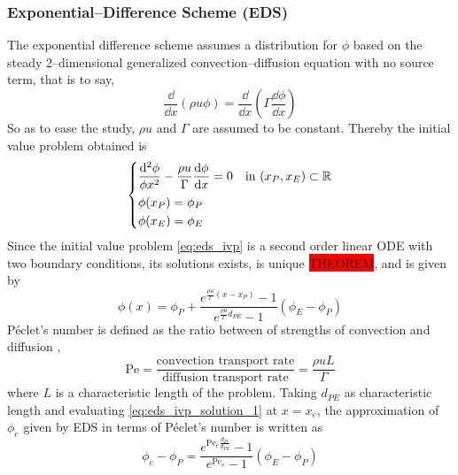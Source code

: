\subsubsection{Exponential--Difference Scheme (EDS)}

The exponential difference scheme assumes a distribution for $\phi$ based on the
steady 2--dimensional generalized convection--diffusion equation with no source
term, that is to say,
\begin{equation}
	\frac{\dd}{\dd{x}} (\rho u \phi) = \frac{\dd}{\dd{x}} \left( \Gamma \frac{\dd{\phi}}{\dd{x}} \right)
\end{equation}
So as to ease the
study, $\rho u$ and $\Gamma$ are assumed to be constant. Thereby the initial
value problem obtained is
\begin{equation} \label{eq:eds_ivp}
	\left\{
	\begin{aligned}
		&\frac{\dd^2 \phi}{\phi{x^2}} - \frac{\rho u}{\Gamma} \frac{\dd{\phi}}{\dd{x}} = 0 & &\text{in } (x_P, x_E) \subset \mathbb{R} \\
		&\phi(x_P) = \phi_P \\
		&\phi(x_E) = \phi_E \\
	\end{aligned}
	\right.
\end{equation}
Since the initial value problem \eqref{eq:eds_ivp} is a second order linear ODE
with two boundary conditions, its solutions exists, is unique \colorbox{red}{THEOREM}, and is given by
\begin{equation} \label{eq:eds_ivp_solution_1}
	\phi(x) = 
	\phi_P +
	\frac{e^{\frac{\rho u}{\Gamma} (x - x_P)} - 1}{e^{\frac{\rho u}{\Gamma} d_{PE}} - 1} (\phi_E - \phi_P)
\end{equation}
Péclet's number is defined as the ratio between of strengths of convection
and diffusion \cite{patankar2008numerical},
\begin{equation}
	\mathrm{Pe} = 
	\frac{\text{convection transport rate}}{\text{diffusion transport rate}} = 
	\frac{\rho u L}{\Gamma}
\end{equation}
where $L$ is a characteristic length of the problem. Taking $d_{PE}$ as characteristic length and evaluating
\eqref{eq:eds_ivp_solution_1} at $x = x_e$, the approximation of $\phi_e$ given
by EDS in terms of Péclet's number is written as
\begin{equation} \label{eq:eds_e}
	\phi_e - \phi_P = 
	\frac{e^{\mathrm{Pe}_e \frac{d_{Pe}}{d_{PE}}} - 1}{e^{\mathrm{Pe}_e} - 1} (\phi_E - \phi_P)
\end{equation}
